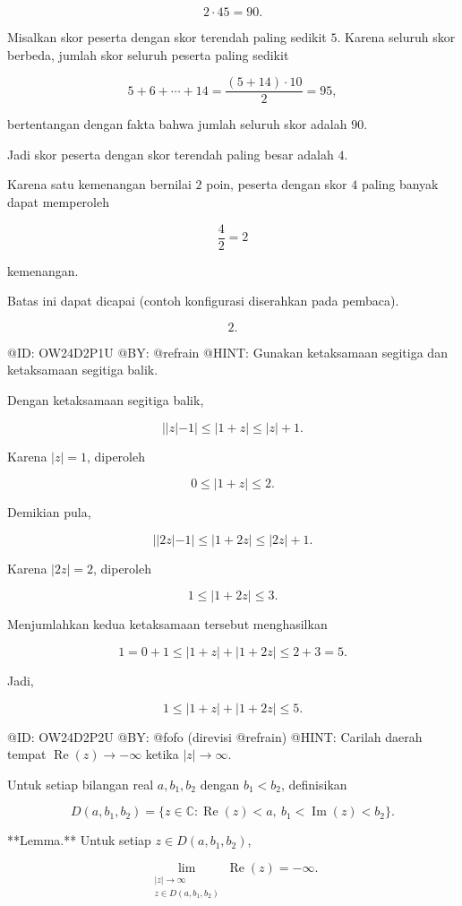 $$
2\cdot45=90.
$$

Misalkan skor peserta dengan skor terendah paling sedikit $5$. Karena seluruh skor berbeda, jumlah skor seluruh peserta paling sedikit

$$
5+6+\cdots+14
=\frac{(5+14)\cdot10}{2}
=95,
$$

bertentangan dengan fakta bahwa jumlah seluruh skor adalah $90$.

Jadi skor peserta dengan skor terendah paling besar adalah $4$.

Karena satu kemenangan bernilai $2$ poin, peserta dengan skor $4$ paling banyak dapat memperoleh

$$
\frac42=2
$$

kemenangan.

Batas ini dapat dicapai (contoh konfigurasi diserahkan pada pembaca).

$$
\boxed{2}.
$$


@ID: OW24D2P1U
@BY: @refrain
@HINT: Gunakan ketaksamaan segitiga dan ketaksamaan segitiga balik.

Dengan ketaksamaan segitiga balik,

$$
||z|-1|
\le
|1+z|
\le
|z|+1.
$$

Karena $|z|=1$, diperoleh

$$
0\le |1+z|\le2.
$$

Demikian pula,

$$
||2z|-1|
\le
|1+2z|
\le
|2z|+1.
$$

Karena $|2z|=2$, diperoleh

$$
1\le |1+2z|\le3.
$$

Menjumlahkan kedua ketaksamaan tersebut menghasilkan

$$
1=0+1
\le
|1+z|+|1+2z|
\le
2+3=5.
$$

Jadi,

$$
\boxed{1\le |1+z|+|1+2z|\le5.}
$$

@ID: OW24D2P2U
@BY: @fofo (direvisi @refrain)
@HINT: Carilah daerah tempat $\operatorname{Re}(z)\to-\infty$ ketika $|z|\to\infty$.

Untuk setiap bilangan real $a,b_1,b_2$ dengan $b_1<b_2$, definisikan

$$
D(a,b_1,b_2)
=
\{z\in\mathbb C:\operatorname{Re}(z)<a,\ b_1<\operatorname{Im}(z)<b_2\}.
$$

**Lemma.** Untuk setiap $z\in D(a,b_1,b_2)$,

$$
\lim_{\substack{|z|\to\infty\\z\in D(a,b_1,b_2)}}
\operatorname{Re}(z)
=
-\infty.
$$

